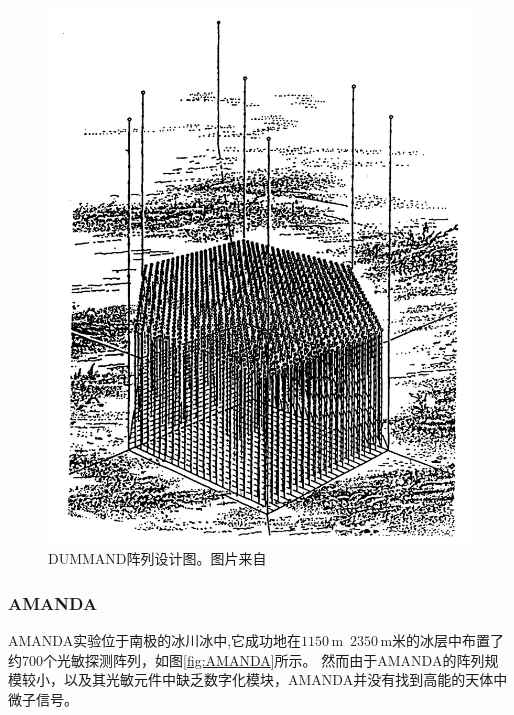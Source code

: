 \begin{figure}[htb]
    \centering
    \includegraphics[width=0.7\linewidth]{img/DUMMAND.png}
    \caption{DUMMAND阵列设计图。图片来自\cite{DUMMAND:1992}}
    \label{fig:DUMMAND}
\end{figure}

\subsubsection*{AMANDA}

AMANDA\cite{AMANDA:1999}实验位于南极的冰川冰中,它成功地在$1150\,\mathrm{m}$~$2350\,\mathrm{m}$米的冰层中布置了约700个光敏探测阵列，如图\ref{fig:AMANDA}所示。
然而由于AMANDA的阵列规模较小，以及其光敏元件中缺乏数字化模块，AMANDA并没有找到高能的天体中微子信号\cite{AMANDA_neutrino_search:2007}。

